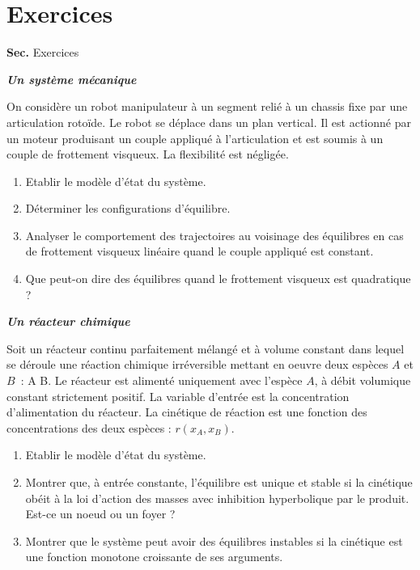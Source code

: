 \newpage
\section{Exercices}
{{\bf Sec. \thesection}\hfill Exercices
\hspace*{5mm}}
 
\begin{exercice} {\bf \em Un système mécanique}

On considère un robot manipulateur à un segment relié à un
chassis  fixe par une articulation rotoïde. Le robot se déplace dans un
plan vertical. Il est actionné par un moteur produisant un couple
appliqué
à l'articulation et est soumis à un couple de frottement visqueux. La
flexibilité est négligée.
\begin{enumerate}
\item Etablir le modèle d'état du système.
\item Déterminer les configurations d'équilibre.
\item Analyser le comportement des trajectoires au voisinage des
équilibres en cas de frottement visqueux linéaire quand le couple
appliqué est constant.
\item Que peut-on dire des équilibres quand le frottement visqueux
est quadratique ?
\end{enumerate}
\end{exercice}
\vv

\begin{exercice}{\bf \em Un réacteur chimique}

Soit un réacteur continu parfaitement mélangé et à volume
constant dans lequel se déroule une réaction chimique 
irréversible mettant en oeuvre deux espèces $A$ et $B$~:
\eqnn
A \longrightarrow B.
\eeqnn
Le réacteur est alimenté uniquement avec l'espèce $A$, à
débit volumique constant strictement positif. La variable d'entrée est
la concentration d'alimentation du réacteur. La cinétique de réaction
est une fonction des concentrations des deux espèces : $r(x_A,x_B)$. 
\begin{enumerate}
\item Etablir le modèle d'état du système.
\item Montrer que, à entrée constante,  l'équilibre est unique et
stable si la cinétique obéit à la loi d'action des masses avec inhibition
hyperbolique par le produit.  Est-ce un noeud ou un foyer ?
\item Montrer que le système peut avoir des équilibres instables 
si la cinétique est une fonction monotone croissante de ses
arguments. 
\end{enumerate}
\end{exercice}
\vv

